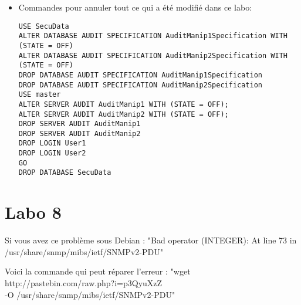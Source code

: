 \documentclass[a4paper]{article}
\begin{document}
\begin{itemize}
\item Commandes pour annuler tout ce qui a été modifié dans ce labo:
\begin{example} \begin{verbatim}
USE SecuData
ALTER DATABASE AUDIT SPECIFICATION AuditManip1Specification WITH (STATE = OFF)
ALTER DATABASE AUDIT SPECIFICATION AuditManip2Specification WITH (STATE = OFF)
DROP DATABASE AUDIT SPECIFICATION AuditManip1Specification
DROP DATABASE AUDIT SPECIFICATION AuditManip2Specification
USE master
ALTER SERVER AUDIT AuditManip1 WITH (STATE = OFF);
ALTER SERVER AUDIT AuditManip2 WITH (STATE = OFF);
DROP SERVER AUDIT AuditManip1
DROP SERVER AUDIT AuditManip2
DROP LOGIN User1
DROP LOGIN User2
GO
DROP DATABASE SecuData
\end{verbatim} \end{example}



\end{itemize}















\section{Labo 8}





Si vous avez ce problème sous Debian : "Bad operator (INTEGER): At line 73 in /usr/share/snmp/mibs/ietf/SNMPv2-PDU"

Voici la commande qui peut réparer l'erreur : "wget http://pastebin.com/raw.php?i=p3QyuXzZ \\-O /usr/share/snmp/mibs/ietf/SNMPv2-PDU"
\end{document}
